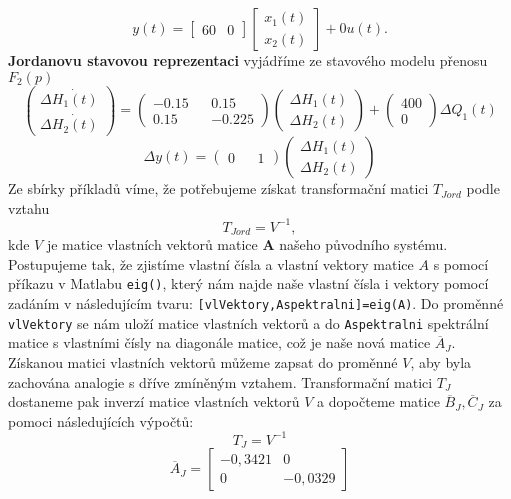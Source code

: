 \documentclass{article}
\begin{document}
				\[y(t)=\begin{bmatrix}
					60&0
				\end{bmatrix}
				\begin{bmatrix}
					x_{1}(t)\\
					x_{2}(t)
				\end{bmatrix}+0u(t).\]
			\textbf{Jordanovu stavovou reprezentaci} vyjádříme ze stavového modelu přenosu \(F_{2}(p)\)
				\[\begin{pmatrix}
					\Delta \dot{H_1(t)}\\
					\Delta \dot{H_2(t)}
				\end{pmatrix}=\begin{pmatrix}
					-0.15 && 0.15\\
					0.15&& -0.225
				\end{pmatrix}\begin{pmatrix}
					\Delta H_1(t)\\
					\Delta H_2(t)
				\end{pmatrix}+\begin{pmatrix}
					400\\
					0
				\end{pmatrix}\Delta Q_1(t)\]
				\[\Delta y(t)=\begin{pmatrix}
					0 && 1
				\end{pmatrix}\begin{pmatrix}
					\Delta H_1(t)\\
					\Delta H_2(t)
				\end{pmatrix}\]
			Ze sbírky příkladů víme, že potřebujeme získat transformační matici \(T_{Jord}\) podle vztahu
				\[T_{Jord}=V^{-1},\]
			kde \(V\) je matice vlastních vektorů matice \(\textbf{A}\) našeho původního systému.
			Postupujeme tak, že zjistíme vlastní čísla a vlastní vektory matice \(A\) s pomocí příkazu v Matlabu \verb*|eig()|, který nám najde naše vlastní čísla i vektory pomocí zadáním v následujícím tvaru: \verb*|[vlVektory,Aspektralni]=eig(A)|. Do proměnné \verb*|vlVektory| se nám uloží matice vlastních vektorů a do \verb*|Aspektralni| spektrální matice s vlastními čísly na diagonále matice, což je naše nová matice \(\overline{A}_{J}\). Získanou matici vlastních vektorů můžeme zapsat do proměnné \(V\), aby byla zachována analogie s dříve zmíněným vztahem.
			Transformační matici \(T_{J}\) dostaneme pak inverzí matice vlastních vektorů \(V\) a dopočteme matice \(\overline{B}_{J},\overline{C}_{J}\) za pomoci následujících výpočtů:
				\[T_{J}=V^{-1}\]
				\[\overline{A}_{J}=\begin{bmatrix}
					-0,3421&0\\
					0&-0,0329
				\end{bmatrix}\]
\end{document}
